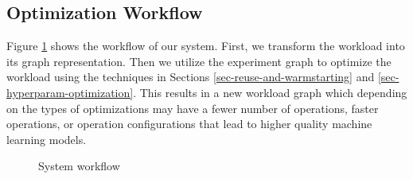 \subsection{Optimization Workflow}
Figure \ref{fig-system-workflow} shows the workflow of our system.
First, we transform the workload into its graph representation.
Then we utilize the experiment graph to optimize the workload using the techniques in Sections \ref{sec-reuse-and-warmstarting} and \ref{sec-hyperparam-optimization}.
This results in a new workload graph which depending on the types of optimizations may have a fewer number of operations, faster operations, or operation configurations that lead to higher quality machine learning models.
\begin{figure}
\centering

\caption{System workflow}
\label{fig-system-workflow}
\end{figure}
